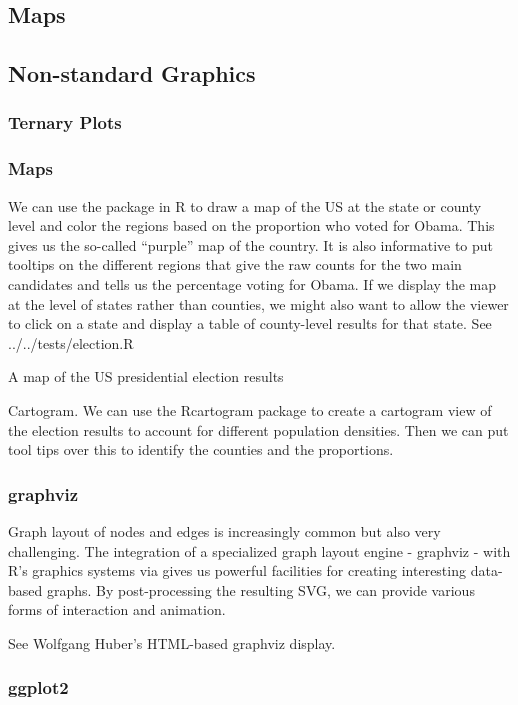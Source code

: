 \documentclass[article]{jss}
\begin{document}
\subsection{Maps}

\subsection{Non-standard Graphics}
\subsubsection{Ternary Plots}

\subsubsection{Maps}
We can use the  package in R to draw a map of the US at the
state or county level and color the regions based on the proportion
who voted for Obama.  This gives us the so-called ``purple'' map of
the country.  It is also informative to put tooltips on the different
regions that give the raw counts for the two main candidates and tells
us the percentage voting for Obama.  If we display the map at the
level of states rather than counties, we might also want to allow the
viewer to click on a state and display a table of county-level results 
for that state.
See ../../tests/election.R



A map of the US presidential election results

Cartogram.  We can use the Rcartogram package to create a cartogram
view of the election results to account for different population
densities.  Then we can put tool tips over this to identify the
counties and the proportions.


\subsubsection{graphviz}
Graph layout of nodes and edges is increasingly common but also very
challenging.  The integration of a specialized graph layout engine -
graphviz \cite{graphviz} - with R's graphics systems via
 gives us powerful facilities for creating interesting
data-based graphs.  By post-processing the resulting SVG, we can
provide various forms of interaction and animation.

See Wolfgang Huber's HTML-based graphviz display.

\subsubsection{ggplot2}
\end{document}
